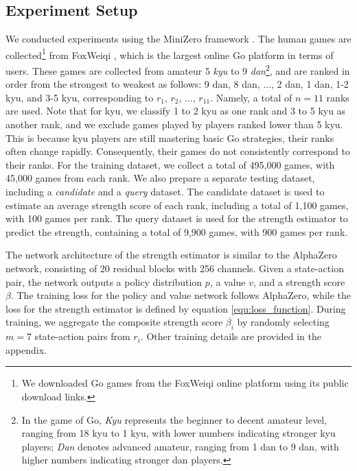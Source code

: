 \subsection{Experiment Setup}
\label{subsec:exp_setups}
We conducted experiments using the MiniZero framework \citep{wu_minizero_2025}.
The human games are collected\footnote{We downloaded Go games from the FoxWeiqi online platform using its public download links.} from FoxWeiqi \citep{fox_weiqi_2025}, which is the largest online Go platform in terms of users.
These games are collected from amateur 5 \textit{kyu} to 9 \textit{dan}\footnote{In the game of Go, \textit{Kyu} represents the beginner to decent amateur level, ranging from 18 kyu to 1 kyu, with lower numbers indicating stronger kyu players; \textit{Dan} denotes advanced amateur, ranging from 1 dan to 9 dan, with higher numbers indicating stronger dan players.}, and are ranked in order from the strongest to weakest as follows: 9 dan, 8 dan, ..., 2 dan, 1 dan, 1-2 kyu, and 3-5 kyu, corresponding to $r_1$, $r_2$, ..., $r_{11}$.
Namely, a total of $n=11$ ranks are used.
Note that for kyu, we classify 1 to 2 kyu as one rank and 3 to 5 kyu as another rank, and we exclude games played by players ranked lower than 5 kyu.
This is because kyu players are still mastering basic Go strategies, their ranks often change rapidly.
Consequently, their games do not consistently correspond to their ranks.
For the training dataset, we collect a total of 495,000 games, with 45,000 games from each rank.
We also prepare a separate testing dataset, including a \textit{candidate} and a \textit{query} dataset.
The candidate dataset is used to estimate an average strength score of each rank, including a total of 1,100 games, with 100 games per rank.
The query dataset is used for the strength estimator to predict the strength, containing a total of 9,900 games, with 900 games per rank.

The network architecture of the strength estimator is similar to the AlphaZero network, consisting of 20 residual blocks with 256 channels.
Given a state-action pair, the network outputs a policy distribution $p$, a value $v$, and a strength score $\beta$.
The training loss for the policy and value network follows AlphaZero, while the loss for the strength estimator is defined by equation \ref{equ:loss_function}.
During training, we aggregate the composite strength score $\overline{\beta_i}$ by randomly selecting $m=7$ state-action pairs from $r_i$.
Other training details are provided in the appendix.

